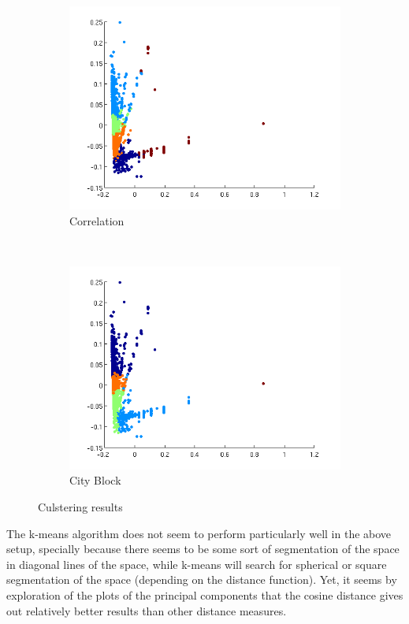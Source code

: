 \documentclass[a4paper,10pt]{article}
\begin{document}
\begin{figure}[h!]
\begin{subfigure}[b]{0.4\textwidth}
\label{fig:cosine}
\end{subfigure}
\begin{subfigure}[b]{0.4\textwidth}
\includegraphics[width=\textwidth]{Images/correlation.png}
\caption{Correlation}
\label{fig:correlation}
\end{subfigure}
~
\begin{subfigure}[b]{0.4\textwidth}
\includegraphics[width=\textwidth]{Images/cityBlock.png}
\caption{City Block}
\label{fig:cityBlock}
\end{subfigure}%
\caption{Culstering results}
\label{fig:cluster}
\end{figure}

The k-means algorithm does not seem to perform particularly well in the above setup, specially because there seems to be some sort of segmentation of the space in diagonal lines of the space, while k-means will search for spherical or square segmentation of the space (depending on the distance function). Yet, it seems by exploration of the plots of the principal components that the cosine distance gives out relatively better results than other distance measures.
\end{document}
